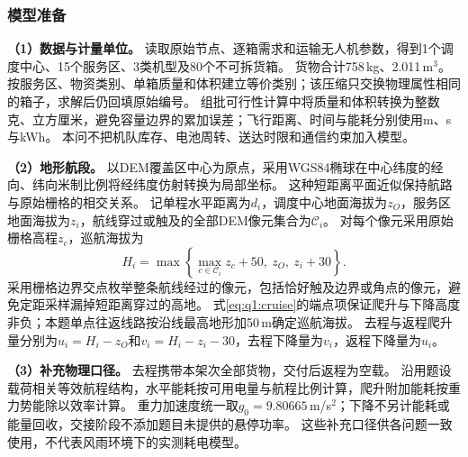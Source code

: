 \subsubsection{模型准备}
\label{sec:q1:preparation}

\textbf{（1）数据与计量单位。}
读取原始节点、逐箱需求和运输无人机参数，得到1个调度中心、15个服务区、3类机型及80个不可拆货箱。
货物合计758\,kg、2.011\,m$^3$。
按服务区、物资类别、单箱质量和体积建立等价类别；该压缩只交换物理属性相同的箱子，求解后仍回填原始编号。
组批可行性计算中将质量和体积转换为整数克、立方厘米，避免容量边界的累加误差；飞行距离、时间与能耗分别使用m、s与kWh。
本问不把机队库存、电池周转、送达时限和通信约束加入模型。

\textbf{（2）地形航段。}
以DEM覆盖区中心为原点，采用WGS84椭球在中心纬度的经向、纬向米制比例将经纬度仿射转换为局部坐标。
这种短距离平面近似保持航路与原始栅格的相交关系。
记单程水平距离为$d_i$，调度中心地面海拔为$z_O$，服务区地面海拔为$z_i$，航线穿过或触及的全部DEM像元集合为$\mathcal C_i$。
对每个像元采用原始栅格高程$z_c$，巡航海拔为
\begin{equation}
 H_i=\max\left\{\max_{c\in\mathcal C_i}z_c+50,\ z_O,\ z_i+30\right\}.
 \label{eq:q1:cruise}
\end{equation}
采用栅格边界交点枚举整条航线经过的像元，包括恰好触及边界或角点的像元，避免定距采样漏掉短距离穿过的高地。
式\eqref{eq:q1:cruise}的端点项保证爬升与下降高度非负；本题单点往返线路按沿线最高地形加50\,m确定巡航海拔。
去程与返程爬升量分别为$u_i=H_i-z_O$和$v_i=H_i-z_i-30$，去程下降量为$v_i$，返程下降量为$u_i$。

\textbf{（3）补充物理口径。}
去程携带本架次全部货物，交付后返程为空载。
沿用题设载荷相关等效航程结构，水平能耗按可用电量与航程比例计算，爬升附加能耗按重力势能除以效率计算。
重力加速度统一取$g_0=9.80665$\,m/s$^2$；下降不另计能耗或能量回收，交接阶段不添加题目未提供的悬停功率。
这些补充口径供各问题一致使用，不代表风雨环境下的实测耗电模型。
